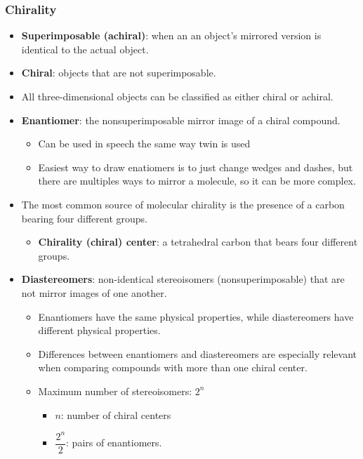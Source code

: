 \documentclass[12pt,a4paper]{article}
\begin{document}
\begin{itemize}
    \subsubsection{Chirality}
    \begin{itemize}
        \item \textbf{Superimposable (achiral)}: when an an object's mirrored version is identical to the actual object.
        \item \textbf{Chiral}: objects that are not superimposable.
        \item All three-dimensional objects can be classified as either chiral or achiral.
        \item \textbf{Enantiomer}: the nonsuperimposable mirror image of a chiral compound.
            \begin{itemize}
                \item Can be used in speech the same way {\color{o-Sun}twin} is used
                \item Easiest way to draw enatiomers is to just change wedges and dashes, but there are multiples ways to mirror a molecule, so it can be more complex.
            \end{itemize}
        \item The most common source of molecular chirality is the presence of a carbon bearing {\color{o-Sun}four different groups}.
            \begin{itemize}
                \item \textbf{Chirality (chiral) center}: a tetrahedral carbon that bears four different groups.
            \end{itemize}
        \item \textbf{Diastereomers}: non-identical stereoisomers (nonsuperimposable) that are {\color{o-Sun}not mirror images} of one another. 
            \begin{itemize}
                    \item  Enantiomers have the same physical properties, while diastereomers have {\color{o-Sun}different physical properties}.
                    \item Differences between enantiomers and diastereomers are especially relevant when comparing compounds with {\color{o-Sun}more than one chiral center}.
                    \item Maximum number of stereoisomers: {\color{o-Sun}\(2^n\)}
                \begin{itemize}
                    \item \(n\): number of chiral centers
                    \item \(\dfrac{2^n}{2}\): pairs of enantiomers.
                \end{itemize}
            \end{itemize}
    \end{itemize}
\end{itemize}
\end{document}
